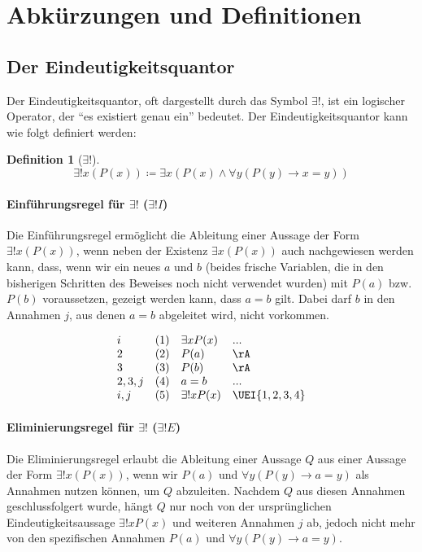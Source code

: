 \documentclass{book}
\theoremstyle{plain}
\theoremstyle{remark}
\theoremstyle{definition}
\newtheorem{definition}{Definition}[section]
\begin{document}
\section{Abkürzungen und Definitionen}
\subsection{Der Eindeutigkeitsquantor}
\label{rule:UEI}\label{rule:UEE}

Der Eindeutigkeitsquantor, oft dargestellt durch das Symbol \(\exists!\), ist ein logischer Operator, der  "`es existiert genau ein"' bedeutet. Der Eindeutigkeitsquantor kann wie folgt definiert werden:
\begin{definition}[\(\exists !\)]
\label{ExonlyonexLpPLpxRpRpLrExxLpPLpxRpAndFayLpPLpyRpToxEqualsyRpRp}
\[
\exists! x(P(x)) \coloneqq \exists x(P(x) \land \forall y(P(y) \rightarrow x = y))
\]
\end{definition}

\paragraph{Einführungsregel für \(\exists!\) (\(\exists! I\))}
Die Einführungsregel ermöglicht die Ableitung einer Aussage der Form \(\exists! x(P(x))\), wenn neben der Existenz \(\exists x(P(x))\) auch nachgewiesen werden kann, dass, wenn wir ein neues \(a\) und \(b\) (beides frische Variablen, die in den bisherigen Schritten des Beweises noch nicht verwendet wurden) mit \(P(a)\) bzw. \(P(b)\) voraussetzen, gezeigt werden kann, dass \(a = b\) gilt. Dabei darf \(b\) in den Annahmen \(j\), aus denen \(a = b\) abgeleitet wird, nicht vorkommen.

\[
\begin{array}{llll}
    i      & (1) & \exists x P(x) & ...\\        
    2      & (2) & P(a)            & \rA\\
    3      & (3) & P(b)            &  \rA\\        
    2,3,j  & (4) & a = b           & ... \\
    i,j    & (5) & \exists! x P(x) & \UEI{1,2,3,4} \\
\end{array}
\]

\paragraph{Eliminierungsregel für \(\exists!\) (\(\exists! E\))}
Die Eliminierungsregel erlaubt die Ableitung einer Aussage \(Q\) aus einer Aussage der Form \(\exists! x(P(x))\), wenn wir \(P(a)\) und \(\forall y (P(y) \rightarrow a = y)\) als Annahmen nutzen können, um \(Q\) abzuleiten. Nachdem \(Q\) aus diesen Annahmen geschlussfolgert wurde, hängt \(Q\) nur noch von der ursprünglichen Eindeutigkeitsaussage \(\exists! x P(x)\) und weiteren Annahmen \(j\) ab, jedoch nicht mehr von den spezifischen Annahmen \(P(a)\) und \(\forall y (P(y) \rightarrow a = y)\).
\end{document}
